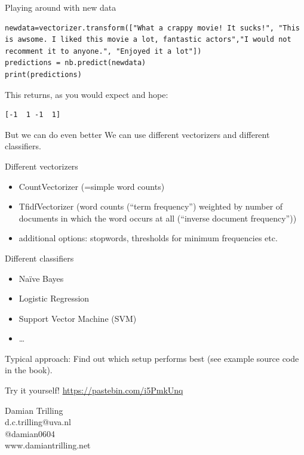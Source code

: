 \documentclass{beamer}
\begin{document}
\begin{frame}[fragile]{Playing around with new data}
\begin{lstlisting}
newdata=vectorizer.transform(["What a crappy movie! It sucks!", "This is awsome. I liked this movie a lot, fantastic actors","I would not recomment it to anyone.", "Enjoyed it a lot"])
predictions = nb.predict(newdata)
print(predictions)
\end{lstlisting}
This returns, as you would expect and hope:
\begin{lstlisting} 
[-1  1 -1  1]
\end{lstlisting}


\end{frame}




\begin{frame}{But we can do even better}
	We can use different vectorizers and different classifiers.
\end{frame}

\begin{frame}{Different vectorizers}
	\begin{itemize}
		\item CountVectorizer (=simple word counts)
		\item TfidfVectorizer (word counts (``term frequency'') weighted by number of documents in which the word occurs at all (``inverse document frequency''))
		\item additional options: stopwords, thresholds for minimum frequencies etc.
	\end{itemize}
\end{frame}

\begin{frame}{Different classifiers}
	\begin{itemize}
		\item Naïve Bayes
		\item Logistic Regression
		\item Support Vector Machine (SVM)
		\item \ldots
	\end{itemize}
Typical approach: Find out which setup performs best (see example source code in the book).
\end{frame}


\begin{frame}{Try it yourself!}
	\huge
	\url{https://pastebin.com/i5PmkUnq}
\end{frame}



\begin{frame}[plain]
	\huge
	\centering
	Damian Trilling\\ \vspace{0.5cm}
	d.c.trilling@uva.nl\\
	@damian0604\\
	www.damiantrilling.net\\
\end{frame}
\end{document}
